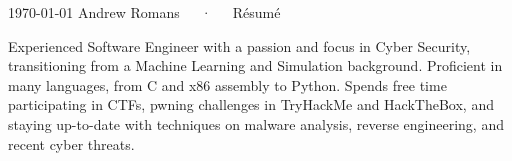 \documentclass[11pt, a4paper]{awesome-cv}
\begin{document}
\makecvheader[C]

\makecvfooter
  {\today}
  {Andrew Romans~~~·~~~Résumé}
  {\thepage}




\begin{cvparagraph}

Experienced Software Engineer with a passion and focus in Cyber Security, transitioning from a Machine Learning and Simulation background. Proficient in many languages, from C and x86 assembly to Python. Spends free time participating in CTFs, pwning challenges in TryHackMe and HackTheBox, and staying up-to-date with techniques on malware analysis, reverse engineering, and recent cyber threats.
\end{cvparagraph}

\end{document}
